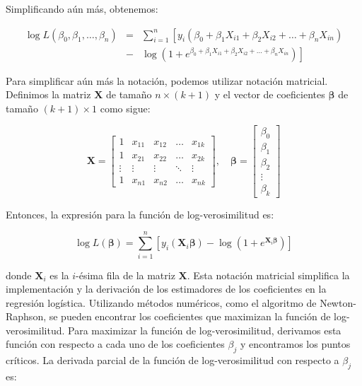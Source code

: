 Simplificando aún más, obtenemos:

\begin{eqnarray*}
\log L(\beta_0, \beta_1, \ldots, \beta_n) &=& \sum_{i=1}^{n} \left[ y_i (\beta_0 + \beta_1 X_{i1} + \beta_2 X_{i2} + \ldots + \beta_n X_{in})\right.\\
& -&\left. \log(1 + e^{\beta_0 + \beta_1 X_{i1} + \beta_2 X_{i2} + \ldots + \beta_n X_{in}}) \right]
\end{eqnarray*}


Para simplificar aún más la notación, podemos utilizar notación matricial. Definimos la matriz $\mathbf{X}$ de tamaño $n \times (k+1)$ y el vector de coeficientes $\boldsymbol{\beta}$ de tamaño $(k+1) \times 1$ como sigue:

\begin{equation}\label{Eq.Matricial1}
\mathbf{X} = \begin{bmatrix}
1 & x_{11} & x_{12} & \ldots & x_{1k} \\
1 & x_{21} & x_{22} & \ldots & x_{2k} \\
\vdots & \vdots & \vdots & \ddots & \vdots \\
1 & x_{n1} & x_{n2} & \ldots & x_{nk}
\end{bmatrix}, \quad
\boldsymbol{\beta} = \begin{bmatrix}
\beta_0 \\
\beta_1 \\
\beta_2 \\
\vdots \\
\beta_k
\end{bmatrix}
\end{equation}

Entonces, la expresión para la función de log-verosimilitud es:

\begin{equation}\label{Eq.LogLikelihood1}
\log L(\boldsymbol{\beta}) = \sum_{i=1}^{n} \left[ y_i (\mathbf{X}_i \boldsymbol{\beta}) - \log(1 + e^{\mathbf{X}_i \boldsymbol{\beta}}) \right]
\end{equation}

donde $\mathbf{X}_i$ es la $i$-ésima fila de la matriz $\mathbf{X}$.  Esta notación matricial simplifica la implementación y la derivación de los estimadores de los coeficientes en la regresión logística. Utilizando métodos numéricos, como el algoritmo de Newton-Raphson, se pueden encontrar los coeficientes que maximizan la función de log-verosimilitud. Para maximizar la función de log-verosimilitud, derivamos esta función con respecto a cada uno de los coeficientes $\beta_j$ y encontramos los puntos críticos. La derivada parcial de la función de log-verosimilitud con respecto a $\beta_j$ es:

